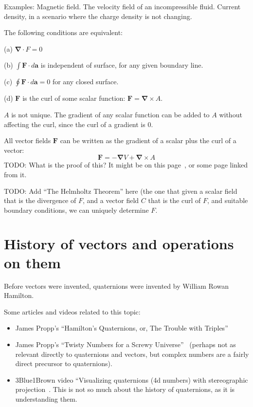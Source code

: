 \documentclass[a4paper]{article}
\theoremstyle{plain}
\theoremstyle{definition}
\newcommand{\vect}[1]{\textbf{#1}}
\newcommand{\del}{\bm{\nabla}}
\begin{document}
Examples: Magnetic field.  The velocity field of an incompressible
fluid.  Current density, in a scenario where the charge density is not
changing.

The following conditions are equivalent:

(a) $\del \cdot F = 0$

(b) $\int \vect{F} \cdot d\vect{a}$ is independent of surface, for any
given boundary line.

(c) $\oint \vect{F} \cdot d\vect{a} = 0$ for any closed surface.

(d) $\vect{F}$ is the curl of some scalar function: $\vect{F} = \del
\times A$.

$A$ is not unique.  The gradient of any scalar function can be added
to $A$ without affecting the curl, since the curl of a gradient is 0.

All vector fields $\vect{F}$ can be written as the gradient of a
scalar plus the curl of a vector:
\begin{equation}
\vect{F} = - \del V + \del \times A
\end{equation}
TODO: What is the proof of this?  It might be on this
page~\cite{WikipediaHelmholtzDecomposition}, or some page linked from
it.

TODO: Add ``The Helmholtz Theorem'' here (the one that given a scalar
field that is the divergence of $F$, and a vector field $C$ that is
the curl of $F$, and suitable boundary conditions, we can uniquely
determine $F$.


\section{History of vectors and operations on them}

Before vectors were invented, quaternions were invented by William
Rowan Hamilton.

Some articles and videos related to this topic:

\begin{itemize}

\item James Propp's ``Hamilton's Quaternions, or, The Trouble with
  Triples''~\cite{HamiltonsQuaternions}

\item James Propp's ``Twisty Numbers for a Screwy
  Universe''~\cite{TwistyNumbers} (perhaps not as relevant directly to
  quaternions and vectors, but complex numbers are a fairly direct
  precursor to quaternions).

\item 3Blue1Brown video ``Visualizing quaternions (4d numbers) with
  stereographic projection~\cite{VisualizingQuaternions}.  This is not
  so much about the history of quaternions, as it is understanding
  them.

\end{itemize}
\end{document}

